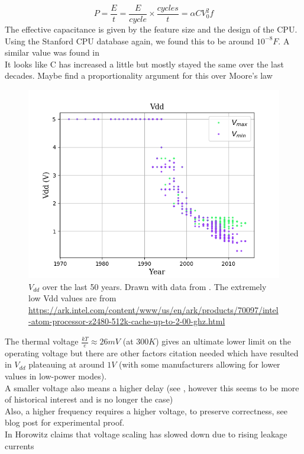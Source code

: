 \documentclass[12pt,a4paper]{article}
\newcommand{\note}{\textcolor{WildStrawberry}}
\begin{document}
\begin{equation}
	P = \frac{E}{t} = \frac{E}{cycle} \times \frac{cycles}{t} = \alpha CV_0^2f
\end{equation}
The effective capacitance is given by the feature size and the design of the CPU. Using the Stanford CPU database again, we found this to be around $10^{-8}F$. A similar value was found in \cite{PowerBlogPost}\\
\note{It looks like C has increased a little but mostly stayed the same over the last decades. Maybe find a proportionality argument for this over Moore's law}\\
\begin{figure}[!h]
	\centering
	\includegraphics[width=\textwidth]{Source/Vdd.png}%
	\caption{$V_{dd}$ over the last 50 years. Drawn with data from \cite{cpudb}. \note{The extremely low Vdd values are from \url{https://ark.intel.com/content/www/us/en/ark/products/70097/intel-atom-processor-z2480-512k-cache-up-to-2-00-ghz.html}}}%
	\label{vdd}
\end{figure}%
The thermal voltage $\frac{kT}{e} \approx 26mV$ (at $300K$) gives an ultimate lower limit on the operating voltage but there are other factors \note{citation needed} which have resulted in $V_{dd}$ plateauing at around $1V$ (with some manufacturers allowing for lower values in low-power modes).\\
\note{A smaller voltage also means a higher delay (see \cite{LowPowerCMOS}, however this seems to be more of historical interest and is no longer the case)}\\
\note{Also, a higher frequency requires a higher voltage, to preserve correctness, see blog post for experimental proof.}\\
\note{In \cite{ComputingsEnergyProblem} Horowitz claims that voltage scaling has slowed down due to rising leakage currents}\\
\end{document}
